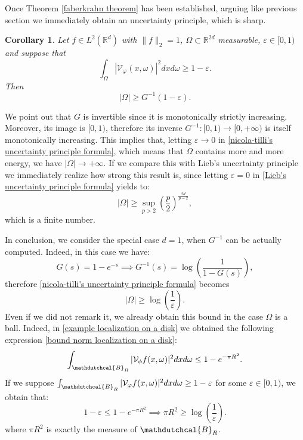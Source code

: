 \documentclass[corpo=11pt, stile=classica, tipotesi=custom,
greek, evenboxes, english]{toptesi}
\numberwithin{equation}{chapter}
\newtheorem{cor}[teo]{Corollary}
\theoremstyle{definition}
\theoremstyle{remark}
\newcommand{\R}{\mathbb{R}} %
\newcommand{\V}{\mathcal{V}} %
\begin{document}
Once Theorem \ref{faberkrahn theorem} has been established, arguing like previous section we immediately obtain an uncertainty principle, which is sharp.
\begin{cor}\label{nicola-tilli's uncertainty principle cor}
	Let $f \in L^2(\R^d)$ with $\|f\|_2 = 1$, $\Omega \subset \R^{2d}$ measurable, $\varepsilon \in [0,1)$ and suppose that
	\begin{equation*}
		\int_{\Omega} |\V_{\varphi}(x,\omega)|^2 dx d\omega \geq 1 - \varepsilon.
	\end{equation*}
	Then
	\begin{equation}\label{nicola-tilli's uncertainty principle formula}
		|\Omega| \geq G^{-1} (1-\varepsilon).
	\end{equation}
\end{cor}
We point out that $G$ is invertible since it is monotonically strictly increasing. Moreover, its image is $[0,1)$, therefore its inverse $G^{-1} : [0,1) \rightarrow [0,+\infty)$ is itself monotonically increasing. This implies that, letting $\varepsilon \rightarrow 0$ in \eqref{nicola-tilli's uncertainty principle formula}, which means that $\Omega$ contains more and more energy, we have $|\Omega| \rightarrow +\infty$. If we compare this with Lieb's uncertainty principle we immediately realize how strong this result is, since letting $\varepsilon=0$ in \eqref{Lieb's uncertainty principle formula} yields to:
\begin{equation*}
	|\Omega| \geq \sup_{p > 2} \left(\dfrac{p}{2}\right)^{\frac{2d}{p-2}},
\end{equation*}
which is a finite number.

In conclusion, we consider the special case $d=1$, when $G^{-1}$ can be actually computed. Indeed, in this case we have:
\begin{equation*}
	G(s)  = 1 - e^{-s} \implies G^{-1}(s) = \log \left(\dfrac{1}{1 - G(s)}\right),
\end{equation*}
therefore \eqref{nicola-tilli's uncertainty principle formula} becomes
\begin{equation*}
	|\Omega| \geq \log\left(\dfrac{1}{\varepsilon}\right).
\end{equation*}
Even if we did not remark it, we already obtain this bound in the case $\Omega$ is a ball. Indeed, in \ref{example localization on a disk} we obtained the following expression \eqref{bound norm localization on a disk}:
\begin{equation*}
	\int_{\mathdutchcal{B}_R} |\V_{\phi} f (x,\omega)|^2 dx d\omega \leq 1 - e^{-\pi R^2}.
\end{equation*}
If we suppose $\int_{\mathdutchcal{B}_R} |\V_{\varphi} f(x,\omega) |^2 dx d\omega \geq 1- \varepsilon$ for some $\varepsilon \in [0,1)$, we obtain that:
\begin{equation*}
	1-\varepsilon \leq 1 - e^{-\pi R^2} \implies \pi R^2 \geq \log\left(\dfrac{1}{\varepsilon}\right).
\end{equation*}
where $\pi R^2$ is exactly the measure of $\mathdutchcal{B}_R$.
\end{document}
